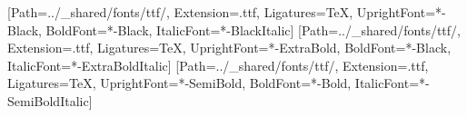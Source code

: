\usepackage{xcolor}

\newfontfamily{}[Path=../_shared/fonts/ttf/, Extension=.ttf, Ligatures=TeX,
  UprightFont=*-Black, BoldFont=*-Black, ItalicFont=*-BlackItalic]
\newfontfamily{}[Path=../_shared/fonts/ttf/, Extension=.ttf, Ligatures=TeX,
  UprightFont=*-ExtraBold, BoldFont=*-Black, ItalicFont=*-ExtraBoldItalic]
\newfontfamily{}[Path=../_shared/fonts/ttf/, Extension=.ttf, Ligatures=TeX,
  UprightFont=*-SemiBold, BoldFont=*-Bold, ItalicFont=*-SemiBoldItalic]

\renewcommand*{\chapterformat}{\mbox{\color{peKiemel}\thechapter\autodot}\enskip}
\renewcommand*{\chaptermarkformat}{\thechapter.\enskip}
\renewcommand*{\sectionmarkformat}{\thesection.\enskip}
\renewcommand*{\partformat}{}
\renewcommand*{\addparttocentry}[2]{\addtocentrydefault{part}{}{#2}}

